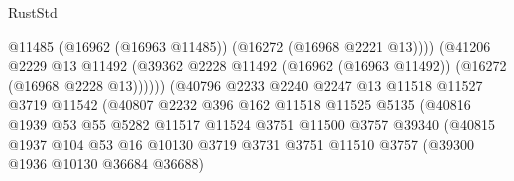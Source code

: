 \begin{lexlean}{RustStd}
\begin{coremodule}
                                              @11485
                                              (@16962 (@16963 @11485))
                                              (@16272 (@16968 @2221 @13))))
                                          (@41206
                                            @2229
                                            @13
                                            @11492
                                            (@39362
                                              @2228
                                              @11492
                                              (@16962 (@16963 @11492))
                                              (@16272 (@16968 @2228 @13))))))
                                      (@40796
                                        @2233
                                        @2240
                                        @2247
                                        @13
                                        @11518
                                        @11527
                                        @3719
                                        @11542
                                        (@40807
                                          @2232
                                          @396
                                          @162
                                          @11518
                                          @11525
                                          @5135
                                          (@40816
                                            @1939
                                            @53
                                            @55
                                            @5282
                                            @11517
                                            @11524
                                            @3751
                                            @11500
                                            @3757
                                            @39340
                                            (@40815
                                              @1937
                                              @104
                                              @53
                                              @16
                                              @10130
                                              @3719
                                              @3731
                                              @3751
                                              @11510
                                              @3757
                                              (@39300 @1936 @10130 @36684 @36688)

\end{coremodule}
\end{lexlean}
